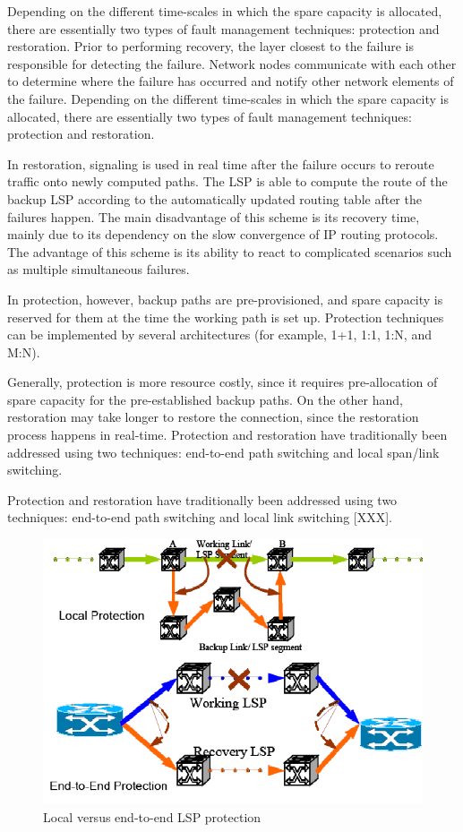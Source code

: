 Depending on the different time-scales in which the spare capacity
is allocated, there are essentially two types of fault management
techniques: protection and restoration. Prior to performing recovery,
the layer closest to the failure is responsible for detecting the
failure. Network nodes communicate with each other to determine where
the failure has occurred and notify other network elements of the
failure. Depending on the different time-scales in which the spare
capacity is allocated, there are essentially two types of fault management
techniques: protection and restoration.

In restoration, signaling is used in real time after the failure occurs
to reroute traffic onto newly computed paths. The LSP is able to compute
the route of the backup LSP according to the automatically updated
routing table after the failures happen. The main disadvantage of
this scheme is its recovery time, mainly due to its dependency on
the slow convergence of IP routing protocols. The advantage of this
scheme is its ability to react to complicated scenarios such as multiple
simultaneous failures.

In protection, however, backup paths are pre-provisioned, and spare
capacity is reserved for them at the time the working path is set
up. Protection techniques can be implemented by several architectures
(for example, 1+1, 1:1, 1:N, and M:N).

Generally, protection is more resource costly, since it requires pre-allocation
of spare capacity for the pre-established backup paths. On the other
hand, restoration may take longer to restore the connection, since
the restoration process happens in real-time. Protection and restoration
have traditionally been addressed using two techniques: end-to-end
path switching and local span/link switching.

Protection and restoration have traditionally been addressed using two techniques: end-to-end path switching and local link switching [XXX].

\begin{figure}
\centering \includegraphics[scale=0.75]{Figures/LocalVsE2EProtection}
\caption{Local versus end-to-end LSP protection}
\label{fig:LocalVsE2EProtection} 
\end{figure}



